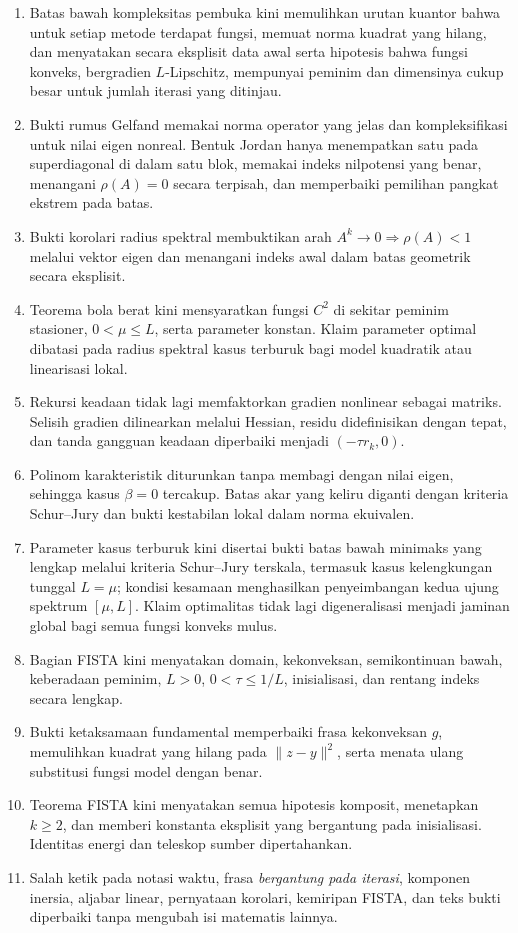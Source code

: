 \documentclass[indonesian]{shinybook}
\begin{document}
\begin{enumerate}
    \item Batas bawah kompleksitas pembuka kini memulihkan urutan kuantor bahwa untuk setiap metode terdapat fungsi, memuat norma kuadrat yang hilang, dan menyatakan secara eksplisit data awal serta hipotesis bahwa fungsi konveks, bergradien \(L\)-Lipschitz, mempunyai peminim dan dimensinya cukup besar untuk jumlah iterasi yang ditinjau.
    \item Bukti rumus Gelfand memakai norma operator yang jelas dan kompleksifikasi untuk nilai eigen nonreal. Bentuk Jordan hanya menempatkan satu pada superdiagonal di dalam satu blok, memakai indeks nilpotensi yang benar, menangani \(\rho(A)=0\) secara terpisah, dan memperbaiki pemilihan pangkat ekstrem pada batas.
    \item Bukti korolari radius spektral membuktikan arah \(A^k\rightarrow0\Rightarrow\rho(A)<1\) melalui vektor eigen dan menangani indeks awal dalam batas geometrik secara eksplisit.
    \item Teorema bola berat kini mensyaratkan fungsi \(C^2\) di sekitar peminim stasioner, \(0<\mu\leq L\), serta parameter konstan. Klaim parameter optimal dibatasi pada radius spektral kasus terburuk bagi model kuadratik atau linearisasi lokal.
    \item Rekursi keadaan tidak lagi memfaktorkan gradien nonlinear sebagai matriks. Selisih gradien dilinearkan melalui Hessian, residu didefinisikan dengan tepat, dan tanda gangguan keadaan diperbaiki menjadi \((-\tau r_k,0)\).
    \item Polinom karakteristik diturunkan tanpa membagi dengan nilai eigen, sehingga kasus \(\beta=0\) tercakup. Batas akar yang keliru diganti dengan kriteria Schur--Jury dan bukti kestabilan lokal dalam norma ekuivalen.
    \item Parameter kasus terburuk kini disertai bukti batas bawah minimaks yang lengkap melalui kriteria Schur--Jury terskala, termasuk kasus kelengkungan tunggal \(L=\mu\); kondisi kesamaan menghasilkan penyeimbangan kedua ujung spektrum \([\mu,L]\). Klaim optimalitas tidak lagi digeneralisasi menjadi jaminan global bagi semua fungsi konveks mulus.
    \item Bagian FISTA kini menyatakan domain, kekonveksan, semikontinuan bawah, keberadaan peminim, \(L>0\), \(0<\tau\leq1/L\), inisialisasi, dan rentang indeks secara lengkap.
    \item Bukti ketaksamaan fundamental memperbaiki frasa kekonveksan \(g\), memulihkan kuadrat yang hilang pada \(\|z-y\|^2\), serta menata ulang substitusi fungsi model dengan benar.
    \item Teorema FISTA kini menyatakan semua hipotesis komposit, menetapkan \(k\geq2\), dan memberi konstanta eksplisit yang bergantung pada inisialisasi. Identitas energi dan teleskop sumber dipertahankan.
    \item Salah ketik pada notasi waktu, frasa \emph{bergantung pada iterasi}, komponen inersia, aljabar linear, pernyataan korolari, kemiripan FISTA, dan teks bukti diperbaiki tanpa mengubah isi matematis lainnya.
\end{enumerate}
\end{document}
